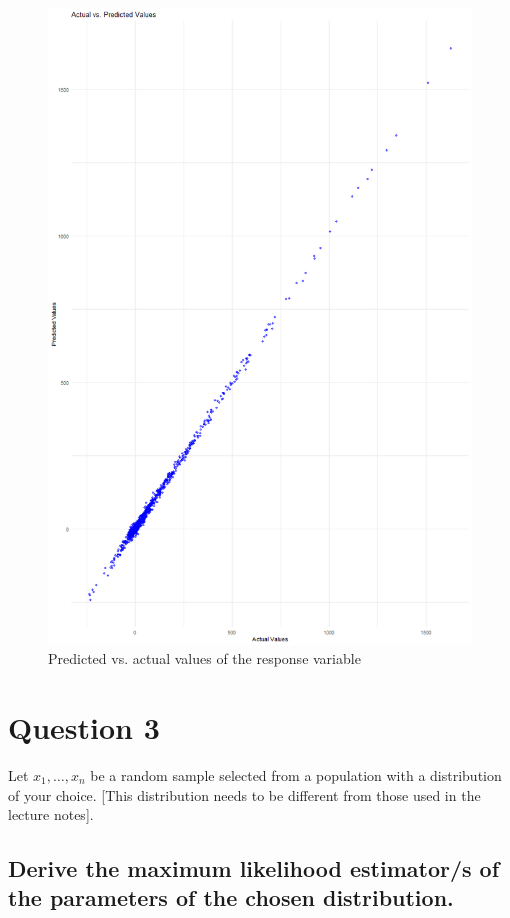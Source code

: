 \documentclass[]{article}
\begin{document}
\begin{figure}[H]
	\centering
	\includegraphics[width=0.7\linewidth]{img/img-2-3-2}
	\caption{Predicted vs. actual values of the response variable}
	\label{fig:img-2-3-2}
\end{figure}






\section{Question 3}

Let $x_1, \dots, x_n$ be a random sample selected from a population with a distribution of your choice. [This distribution needs to be different from those used in the lecture notes].

\subsection{Derive the maximum likelihood estimator/s of the parameters of the chosen distribution.}
\end{document}
